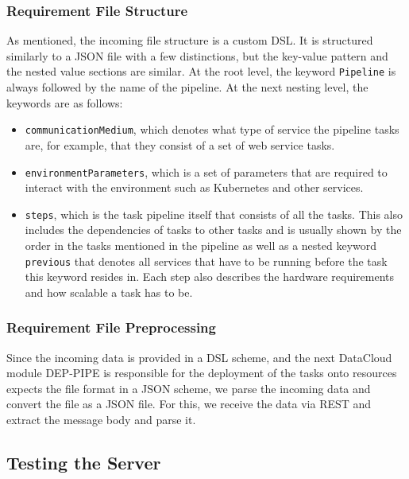 \documentclass{article}
\begin{document}
            \subsubsection{Requirement File Structure}

                As mentioned, the incoming file structure is a custom DSL.
                It is structured similarly to a JSON file with a few distinctions, but the key-value pattern and the nested value sections are similar. At the root level, the keyword \texttt{Pipeline} is always followed by the name of the pipeline.
                At the next nesting level, the keywords are as follows: 
                \begin{itemize}
                    \item \texttt{communicationMedium}, which denotes what type of service the pipeline tasks are, for example, that they consist of a set of web service tasks.
                    \item \texttt{environmentParameters}, which is a set of parameters that are required to interact with the environment such as Kubernetes and other services.
                    \item \texttt{steps}, which is the task pipeline itself that consists of all the tasks. This also includes the dependencies of tasks to other tasks and is usually shown by the order in the tasks mentioned in the pipeline as well as a nested keyword \texttt{previous} that denotes all services that have to be running before the task this keyword resides in. Each step also describes the hardware requirements and how scalable a task has to be.
                \end{itemize}
                

            \subsubsection{Requirement File Preprocessing}

                Since the incoming data is provided in a DSL scheme, and the next DataCloud module DEP-PIPE is responsible for the deployment of the tasks onto resources expects the file format in a JSON scheme, we parse the incoming data and convert the file as a JSON file. For this, we receive the data via REST and extract the message body and parse it.



        \subsection{Testing the Server}
\end{document}
